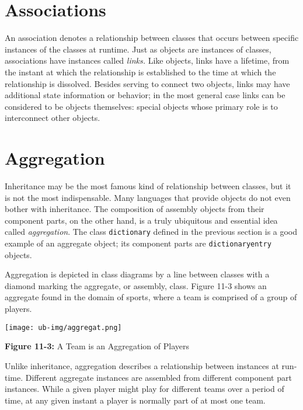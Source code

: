 \section{Associations}

An association denotes a relationship between classes
that occurs between specific instances of the classes at runtime.
Just as objects are instances of classes, associations
have instances called \textit{links.}
Like objects, links have a lifetime, from the instant
at which the relationship is established to the time at which the
relationship is dissolved. Besides serving to connect two objects,
links may have additional state information or behavior; in the most
general case links can be considered to be objects themselves: special
objects whose primary role is to interconnect other objects.

\section{Aggregation}

Inheritance may be the most famous kind of relationship between classes,
but it is not the most indispensable. Many languages that provide
objects do not even bother with inheritance. The composition of
assembly objects from their component parts, on the other hand, is a
truly ubiquitous and essential idea called
\textit{aggregation}. The class \texttt{dictionary}
defined in the previous section is a good example of an aggregate
object; its component parts are \texttt{dictionaryentry} objects.

Aggregation is depicted in class diagrams by a line between classes with
a diamond marking the aggregate, or assembly, class. Figure 11-3
shows an aggregate found in the domain of sports, where a team is
comprised of a group of players.

\begin{center}
\texttt{[image: ub-img/aggregat.png]}

{\sffamily\bfseries Figure 11-3:}
{\sffamily A Team is an Aggregation of Players}
\end{center}

Unlike inheritance, aggregation describes a relationship between
instances at run-time. Different aggregate instances are assembled from
different component part instances. While a given player might play for
different teams over a period of time, at any given instant a player is
normally part of at most one team.

